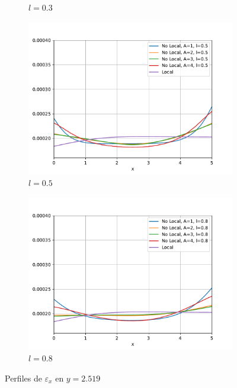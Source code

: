 \begin{figure}
\begin{subfigure}{0.48\textwidth}
		        \caption{$l=0.3$}
		        \label{fig:perfilesY0259.03}
		    \end{subfigure}
		    \quad
		    \begin{subfigure}{0.48\textwidth}
		    \centering
		        \includegraphics[width=\textwidth]{figuras/Placa/Perfiles/Y/Y0.5_2.519.pdf}
		        \caption{$l=0.5$}
		        \label{fig:perfilesY0259.05}
		    \end{subfigure}
		    \begin{subfigure}{0.48\textwidth}
		    \centering
		        \includegraphics[width=\textwidth]{figuras/Placa/Perfiles/Y/Y0.8_2.519.pdf}
		        \caption{$l=0.8$}
		        \label{fig:perfilesY0259.08}
		    \end{subfigure}
		    \caption{Perfiles de $\varepsilon_x$ en $y=2.519$}
		    \label{fig:perfilesY0259}
		\end{figure}
